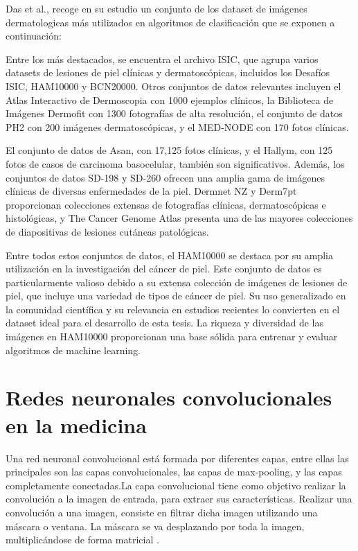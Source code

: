 Das et al.,  recoge en su estudio un conjunto de los dataset de imágenes dermatologicas más utilizados en algoritmos de clasificación que se exponen a continuación:

Entre los más destacados, se encuentra el archivo ISIC, que agrupa varios datasets de lesiones de piel clínicas y dermatoscópicas, incluidos los Desafíos ISIC, HAM10000 y BCN20000. Otros conjuntos de datos relevantes incluyen el Atlas Interactivo de Dermoscopia con 1000 ejemplos clínicos, la Biblioteca de Imágenes Dermofit con 1300 fotografías de alta resolución, el conjunto de datos PH2 con 200 imágenes dermatoscópicas, y el MED-NODE con 170 fotos clínicas.

El conjunto de datos de Asan, con 17,125 fotos clínicas, y el Hallym, con 125 fotos de casos de carcinoma basocelular, también son significativos. Además, los conjuntos de datos SD-198 y SD-260 ofrecen una amplia gama de imágenes clínicas de diversas enfermedades de la piel. Dermnet NZ y Derm7pt proporcionan colecciones extensas de fotografías clínicas, dermatoscópicas e histológicas, y The Cancer Genome Atlas presenta una de las mayores colecciones de diapositivas de lesiones cutáneas patológicas.

Entre todos estos conjuntos de datos, el HAM10000 se destaca por su amplia utilización en la investigación del cáncer de piel. Este conjunto de datos es particularmente valioso debido a su extensa colección de imágenes de lesiones de piel, que incluye una variedad de tipos de cáncer de piel. Su uso generalizado en la comunidad científica y su relevancia en estudios recientes lo convierten en el dataset ideal para el desarrollo de esta tesis. La riqueza y diversidad de las imágenes en HAM10000 proporcionan una base sólida para entrenar y evaluar algoritmos de machine learning.


\section{Redes neuronales convolucionales en la medicina}   

Una red neuronal convolucional está formada por diferentes capas, entre ellas las principales son las capas convolucionales, las capas de max-pooling, y las capas completamente conectadas.La capa convolucional tiene como objetivo realizar la convolución a la imagen de entrada, para extraer sus características. Realizar una convolución a una imagen, consiste en filtrar dicha imagen utilizando una máscara o ventana. La máscara se va desplazando por toda la imagen, multiplicándose de forma matricial .

